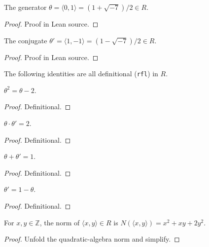 \begin{definition}[$\theta$]
  \label{def:theta}
  \leanok
  The generator $\theta = \langle 0, 1\rangle = (1+\sqrt{-7})/2 \in R$.
\end{definition}
\begin{proof}\leanok
  Proof in Lean source.
\end{proof}

\begin{definition}[$\theta'$]
  \label{def:theta'}
  \leanok
  The conjugate $\theta' = \langle 1, -1\rangle = (1-\sqrt{-7})/2 \in R$.
\end{definition}
\begin{proof}\leanok
  Proof in Lean source.
\end{proof}

The following identities are all definitional (\texttt{rfl}) in $R$.

\begin{lemma}[$\theta^2 = \theta - 2$]
  \label{lem:theta_sq}
  \leanok
  $\theta^2 = \theta - 2$.
\end{lemma}
\begin{proof}\leanok
  Definitional.
\end{proof}

\begin{lemma}[$\theta \cdot \theta' = 2$]
  \label{lem:theta_mul_theta'}
  \leanok
  $\theta \cdot \theta' = 2$.
\end{lemma}
\begin{proof}\leanok
  Definitional.
\end{proof}

\begin{lemma}[$\theta + \theta' = 1$]
  \label{lem:theta_add_theta'}
  \leanok
  $\theta + \theta' = 1$.
\end{lemma}
\begin{proof}\leanok
  Definitional.
\end{proof}

\begin{lemma}[$\theta' = 1 - \theta$]
  \label{lem:theta'_eq_one_sub_theta}
  \leanok
  $\theta' = 1 - \theta$.
\end{lemma}
\begin{proof}\leanok
  Definitional.
\end{proof}

\begin{lemma}
  \label{lem:norm_eq}
  \leanok
  For $x, y \in \mathbb{Z}$, the norm of $\langle x, y\rangle \in R$ is
  $N(\langle x, y\rangle) = x^2 + xy + 2y^2$.
\end{lemma}
\begin{proof}\leanok
  Unfold the quadratic-algebra norm and simplify.
\end{proof}

